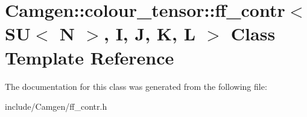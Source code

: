 \hypertarget{a00223}{\section{Camgen\-:\-:colour\-\_\-tensor\-:\-:ff\-\_\-contr$<$ S\-U$<$ N $>$, I, J, K, L $>$ Class Template Reference}
\label{a00223}
}


The documentation for this class was generated from the following file\-:\begin{DoxyCompactItemize}
\item 
include/\-Camgen/ff\-\_\-contr.\-h\end{DoxyCompactItemize}
